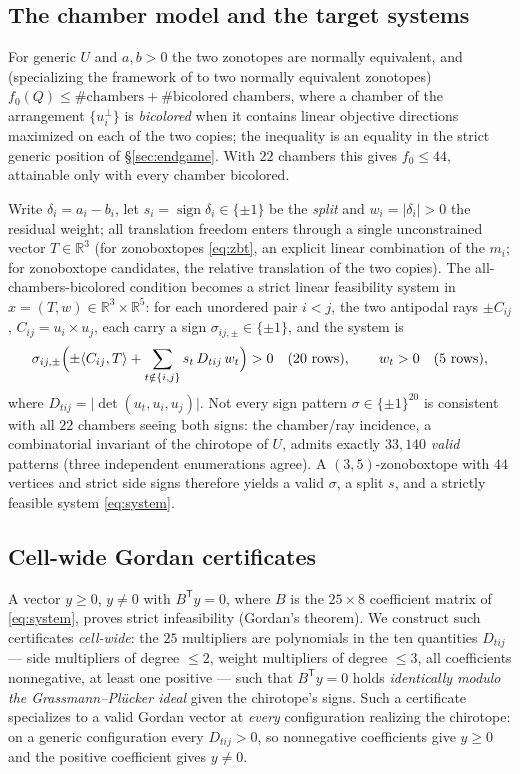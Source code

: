 \documentclass[11pt]{amsart}
\theoremstyle{remark}
\newcommand{\sign}{\operatorname{sign}}
\newcommand{\RR}{\mathbb{R}}
\begin{document}
\subsection{The chamber model and the target systems}
For generic $U$ and $a,b>0$ the two zonotopes are normally equivalent,
and (specializing the framework of \cite[\S\S 5--6]{BCLS} to two
normally equivalent zonotopes)
$f_0(Q) \le \#\text{chambers} + \#\text{bicolored chambers}$, where a
chamber of the arrangement $\{u_i^\perp\}$ is \emph{bicolored} when it
contains linear objective directions maximized on each of the two
copies; the inequality is an equality in the strict generic position
of \S\ref{sec:endgame}. With $22$ chambers this gives $f_0\le 44$,
attainable only with every chamber bicolored.

Write $\delta_i = a_i - b_i$, let $s_i=\sign\delta_i\in\{\pm1\}$ be the
\emph{split} and $w_i=|\delta_i|>0$ the residual weight; all
translation freedom enters through a
single unconstrained vector $T\in\RR^3$ (for zonoboxtopes
\eqref{eq:zbt}, an explicit linear combination of the $m_i$; for
zonoboxtope candidates, the relative translation of the two copies).
The all-chambers-bicolored condition becomes a strict linear
feasibility system in $x=(T,w)\in\RR^3\times\RR^5$: for each unordered
pair $i<j$, the two antipodal rays $\pm C_{ij}$, $C_{ij}=u_i\times u_j$,
each carry a sign $\sigma_{ij,\pm}\in\{\pm1\}$, and the system is
\begin{equation}\label{eq:system}
  \sigma_{ij,\pm}\Bigl(\pm\langle C_{ij}, T\rangle
  + \sum_{t\notin\{i,j\}} s_t\, D_{tij}\, w_t\Bigr) > 0
  \quad (20 \text{ rows}), \qquad w_t>0 \quad (5 \text{ rows}),
\end{equation}
where $D_{tij}=\lvert\det(u_t,u_i,u_j)\rvert$. Not every sign pattern
$\sigma\in\{\pm1\}^{20}$ is consistent with all $22$ chambers seeing
both signs: the chamber/ray incidence, a combinatorial invariant of the
chirotope of $U$, admits exactly $33{,}140$ \emph{valid} patterns
(three independent enumerations agree). A $(3,5)$-zonoboxtope with
$44$ vertices and strict side signs therefore yields a valid $\sigma$,
a split $s$, and a strictly feasible system \eqref{eq:system}.

\subsection{Cell-wide Gordan certificates}\label{sec:certs}
A vector $y\ge 0$, $y\ne 0$ with $B^{\mathsf T}y=0$, where $B$ is the
$25\times 8$ coefficient matrix of \eqref{eq:system}, proves strict
infeasibility (Gordan's theorem). We construct such certificates
\emph{cell-wide}: the $25$ multipliers are polynomials in the ten
quantities $D_{tij}$ --- side multipliers of degree $\le 2$, weight
multipliers of degree $\le 3$, all coefficients nonnegative, at least
one positive --- such that $B^{\mathsf T}y=0$ holds \emph{identically
modulo the Grassmann--Pl\"ucker ideal} given the chirotope's signs.
Such a certificate specializes to a valid Gordan vector at
\emph{every} configuration realizing the chirotope: on a generic
configuration every $D_{tij}>0$, so nonnegative coefficients give
$y\ge0$ and the positive coefficient gives $y \neq 0$.
\end{document}
